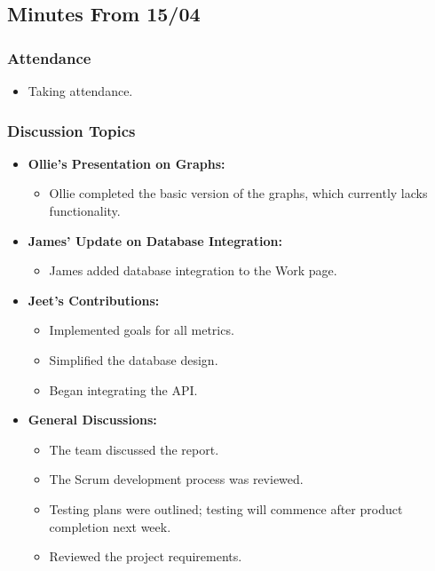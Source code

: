 \documentclass[11pt]{article}
\begin{document}
\hypertarget{minutes-from-1504}{%
\subsection{Minutes From 15/04}\label{minutes-from-1504}}

\hypertarget{attendance-3}{%
\subsubsection{Attendance}\label{attendance-3}}

\begin{itemize}
\tightlist
\item
  Taking attendance.
\end{itemize}

\hypertarget{discussion-topics-2}{%
\subsubsection{Discussion Topics}\label{discussion-topics-2}}

\begin{itemize}
\tightlist
\item
  \textbf{Ollie's Presentation on Graphs:}

  \begin{itemize}
  \tightlist
  \item
    Ollie completed the basic version of the graphs, which currently
    lacks functionality.
  \end{itemize}
\item
  \textbf{James' Update on Database Integration:}

  \begin{itemize}
  \tightlist
  \item
    James added database integration to the Work page.
  \end{itemize}
\item
  \textbf{Jeet's Contributions:}

  \begin{itemize}
  \tightlist
  \item
    Implemented goals for all metrics.
  \item
    Simplified the database design.
  \item
    Began integrating the API.
  \end{itemize}
\item
  \textbf{General Discussions:}

  \begin{itemize}
  \tightlist
  \item
    The team discussed the report.
  \item
    The Scrum development process was reviewed.
  \item
    Testing plans were outlined; testing will commence after product
    completion next week.
  \item
    Reviewed the project requirements.
  \end{itemize}
\end{itemize}
\end{document}
